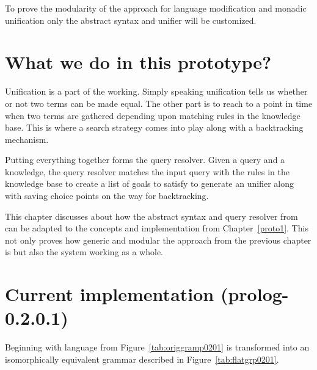 \documentclass[thesis-solanki.tex]{subfiles}
\begin{document}
To prove the modularity of the approach for language modification and monadic unification only the abstract syntax
and unifier will be customized.



\section{What we do in this prototype?}

Unification is a part of the  working. Simply speaking unification tells us whether or not two terms can be made equal.
The other part is to reach to a point in time when two terms are gathered depending upon matching rules in the knowledge base. This is where
a search strategy comes into play along with a backtracking mechanism.

Putting everything together forms the  query resolver. Given a query and a knowledge, the query resolver matches the
input query with the rules in the knowledge base to create a list of goals to satisfy to generate an unifier along with saving choice
points on the way for backtracking.

This chapter discusses about how the abstract syntax and query resolver from \cite{prolog-lib} can be adapted to the concepts and
implementation from Chapter~\ref{proto1}. This not only proves how generic and modular the approach from the previous chapter is but also
the system working as a whole.



\section{Current implementation (prolog-0.2.0.1)}

Beginning with language from Figure~\ref{tab:origgramp0201} is transformed into an isomorphically equivalent
grammar described in Figure~\ref{tab:flatgrp0201}.
\end{document}

